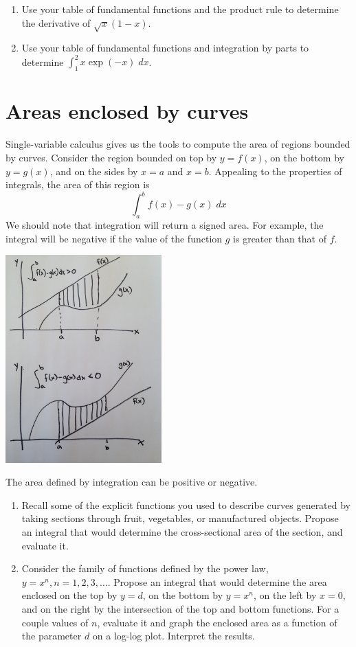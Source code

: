\documentclass{tufte-handout}
\begin{document}
\begin{enumerate}[resume]
\item Use your table of fundamental functions and the product rule to determine the derivative of $\sqrt{x} (1-x)$.
\item Use your table of fundamental functions and integration by parts to determine $\int_1^2 x \exp(-x) \; dx$.
\end{enumerate}

\section{Areas enclosed by curves}

Single-variable calculus gives us the tools to compute the area of regions bounded by curves. Consider the region bounded on top by $y=f(x)$, on the bottom by $y = g(x)$, and on the sides by $x=a$ and $x=b$. Appealing to the properties of integrals, the area of this region is
\[\int_a^b f(x) - g(x) \; dx \]
We should note that integration will return a signed area. For example, the integral will be negative if the value of the function $g$ is greater than that of $f$.

\begin{marginfigure}
\includegraphics[width=6cm]{figs/signedarea}
\caption{The area defined by integration can be positive or negative.}
\end{marginfigure}

\begin{enumerate}[resume]
\item Recall some of the explicit functions you used to describe curves generated by taking sections through fruit, vegetables, or manufactured objects. Propose an integral that would determine the cross-sectional area of the section, and evaluate it.
\item Consider the family of functions defined by the power law, $y = x^n, n = 1,2,3,\ldots$. Propose an integral that would determine the area enclosed on the top by $y=d$, on the bottom by $y = x^n$, on the left by $x=0$, and on the right by the intersection of the top and bottom functions. For a couple values of $n$, evaluate it and graph the enclosed area as a function of the parameter $d$ on a log-log plot. Interpret the results.
\end{enumerate}
\end{document}
